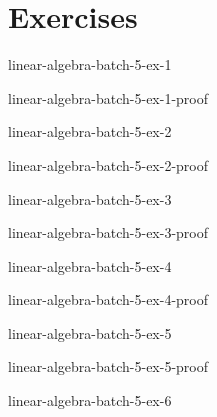 \documentclass[preview]{standalone}
\begin{document}
\genpage

\section{Exercises}

\begin{snippetexercise}{linear-algebra-batch-5-ex-1}{}
    \todo
\end{snippetexercise}

\begin{snippetsolution}{linear-algebra-batch-5-ex-1-proof}{}
    \todo
\end{snippetsolution}

\begin{snippetexercise}{linear-algebra-batch-5-ex-2}{}
    \todo
\end{snippetexercise}

\begin{snippetsolution}{linear-algebra-batch-5-ex-2-proof}{}
    \todo
\end{snippetsolution}

\begin{snippetexercise}{linear-algebra-batch-5-ex-3}{}
    \todo
\end{snippetexercise}

\begin{snippetsolution}{linear-algebra-batch-5-ex-3-proof}{}
    \todo
\end{snippetsolution}

\begin{snippetexercise}{linear-algebra-batch-5-ex-4}{}
    \todo
\end{snippetexercise}

\begin{snippetsolution}{linear-algebra-batch-5-ex-4-proof}{}
    \todo
\end{snippetsolution}

\begin{snippetexercise}{linear-algebra-batch-5-ex-5}{}
    \todo
\end{snippetexercise}

\begin{snippetsolution}{linear-algebra-batch-5-ex-5-proof}{}
    \todo
\end{snippetsolution}

\begin{snippetexercise}{linear-algebra-batch-5-ex-6}{}
    \todo
\end{snippetexercise}
\end{document}
